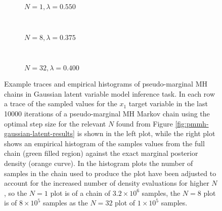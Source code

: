 \begin{figure}[t]
\centering
\begin{subfigure}[b]{\linewidth}
\centering
  \vspace{-5mm}
  \caption{$N=1, \lambda=0.550$}
  \label{sfig:pm-mh-1-gaussian-latent-trace}
\end{subfigure}
\\[3mm]
\begin{subfigure}[b]{\linewidth}
\centering
  \vspace{-5mm}
  \caption{$N=8, \lambda=0.375$}
  \label{sfig:pm-mh-8-gaussian-latent-trace}
\end{subfigure}
\\[3mm]
\begin{subfigure}[b]{\linewidth}
\centering
  \vspace{-5mm}
  \caption{$N=32, \lambda=0.400$}
  \label{sfig:pm-mh-32-gaussian-latent-trace}
\end{subfigure}
\caption[Pseudo-marginal \acs{MH} Gaussian model traces.]{
Example traces and empirical histograms of pseudo-marginal \ac{MH} chains in Gaussian latent variable model inference task. In each row a trace of the sampled values for the $x_1$ target variable in the last 10000 iterations of a pseudo-marginal \ac{MH} Markov chain using the optimal step size for the relevant $N$ found from Figure \ref{fig:pmmh-gaussian-latent-results} is shown in the left plot, while the right plot shows an empirical histogram of the samples values from the full chain (green filled region) against the exact marginal posterior density (orange curve). In the histogram plots the number of samples in the chain used to produce the plot have been adjusted to account for the increased number of density evaluations for higher $N$, so the $N=1$ plot is of a chain of $3.2\times 10^6$ samples, the $N=8$ plot is of $8\times 10^5$ samples as the $N=32$ plot of $1 \times 10^5$ samples.}
\label{fig:pmmh-gaussian-latent-traces}
\end{figure}

